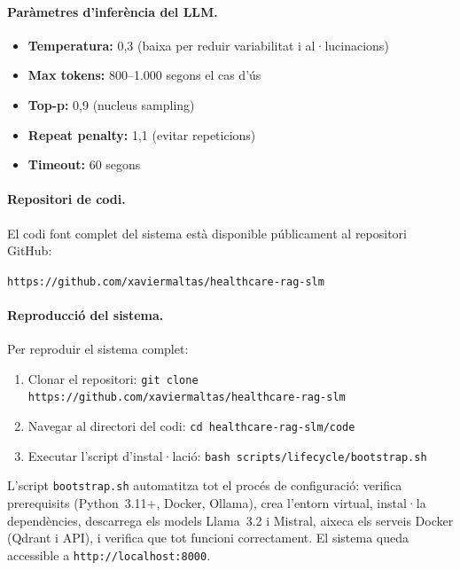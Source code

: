 \documentclass[CAT]{TFUOC}%
\begin{document}
\paragraph{Paràmetres d'inferència del LLM.}
\begin{itemize}
    \item \textbf{Temperatura:} 0,3 (baixa per reduir variabilitat i al·lucinacions)
    \item \textbf{Max tokens:} 800--1.000 segons el cas d'ús
    \item \textbf{Top-p:} 0,9 (nucleus sampling)
    \item \textbf{Repeat penalty:} 1,1 (evitar repeticions)
    \item \textbf{Timeout:} 60 segons
\end{itemize}

\paragraph{Repositori de codi.}
El codi font complet del sistema està disponible públicament al repositori GitHub:

\texttt{https://github.com/xaviermaltas/healthcare-rag-slm}

\paragraph{Reproducció del sistema.}
Per reproduir el sistema complet:
\begin{enumerate}
    \item Clonar el repositori: \texttt{git clone https://github.com/xaviermaltas/healthcare-rag-slm}
    \item Navegar al directori del codi: \texttt{cd healthcare-rag-slm/code}
    \item Executar l'script d'instal·lació: \texttt{bash scripts/lifecycle/bootstrap.sh}
\end{enumerate}

L'script \texttt{bootstrap.sh} automatitza tot el procés de configuració: verifica prerequisits (Python~3.11+, Docker, Ollama), crea l'entorn virtual, instal·la dependències, descarrega els models Llama~3.2 i Mistral, aixeca els serveis Docker (Qdrant i API), i verifica que tot funcioni correctament. El sistema queda accessible a \texttt{http://localhost:8000}.
\end{document}
